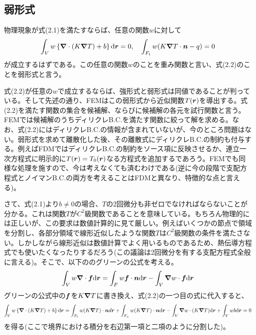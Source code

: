 \documentclass[dvipdfmx, 9pt, a4paper]{jsarticle}
\numberwithin{equation}{section}
\newcommand{\bm}[1]{{\mbox{\boldmath $#1$}}}
\newcommand{\bnabla}{\bm \nabla}
\begin{document}
\subsection{弱形式}
物理現象が式(2.1)を満たすならば、任意の関数$w$に対して
\begin{equation}
\int_V w\left\{\bnabla \cdot (K\bnabla T)+b\right\}{\rm d}\bm r=0,~~~\int_{F_t}w(K\bnabla T \cdot \bm n - q)=0
\end{equation}
が成立するはずである。この任意の関数$w$のことを重み関数と言い、式(2.2)のことを弱形式と言う。\par
式(2.2)が任意の$w$で成立するならば、強形式と弱形式は同値であることが判っている。そして先述の通り、FEMはこの弱形式から近似関数$T(\bm r)$を導出する。式(2.2)を満たす関数の集合を候補解、ならびに候補解の各元を試行関数と言う。FEMでは候補解のうちディリクレB.C.を満たす関数に絞って解を求める。なお、式(2.2)にはディリクレB.C.の情報が含まれていないが、今のところ問題はない。弱形式を求めて離散化した後、その離散式にディリクレB.C.の制約も付与する。例えばFDMではディリクレB.C.の制約をソース項に反映させるか、連立一次方程式に明示的に$T(\bm r)=T_0(\bm r)$なる方程式を追加するであろう。FEMでも同様な処理を施すので、今は考えなくても済むわけである(逆に今の段階で支配方程式とノイマンB.C.の両方を考えることはFDMと異なり、特徴的な点と言える)。\par
さて、式(2.1)より$b \neq 0$の場合、$T$の2回微分も非ゼロでなければならないことが分かる。これは関数$T$が$C^2$級関数であることを意味している。もちろん物理的には正しいが、この要求は数値計算的に見て厳しい。例えばいくつかの節点で領域を分割し、各部分領域で線形近似したような関数$T$は$C^2$級関数の条件を満たさない。しかしながら線形近似は数値計算でよく用いるものであるため、熱伝導方程式でも使いたくなったりするだろう(この議論は2回微分を有する支配方程式全般に言える)。そこで、以下ののグリーンの公式を考える。
\begin{equation}
\int_V w\bnabla \cdot \bm f {\rm d}\bm r=\int_Fw\bm f \cdot \bm n{\rm d}\bm r - \int_V \bnabla w\cdot \bm f{\rm d}\bm r \notag
\end{equation}
グリーンの公式中の$\bm f$を$K\bnabla T$に書き換え、式(2.2)の一つ目の式に代入すると、
\begin{equation}
\int_V w\left\{\bnabla \cdot (K\bnabla T)+b\right\}{\rm d}\bm r=\int_{F_t}w(K\bnabla T)\cdot \bm nd \bm r + \int_{F_u}w(K\bnabla T)\cdot \bm n{\rm d} \bm r - \int_V\bnabla w \cdot (K\bnabla T) {\rm d} \bm r+\int_Vwb{\rm d}\bm r=0 \notag
\end{equation}
を得る(ここで境界における積分を右辺第一項と二項のように分割した)。\par
\end{document}
